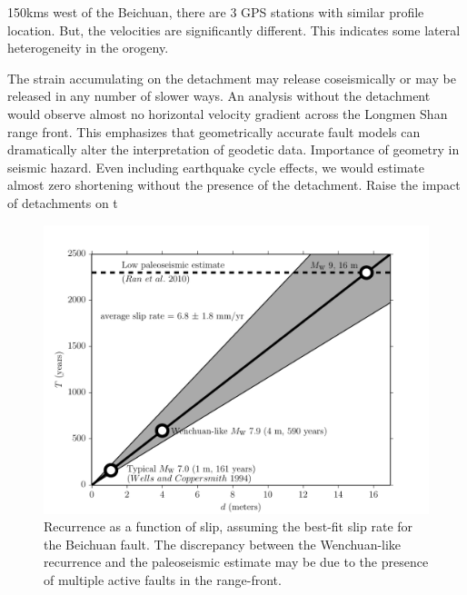 \documentclass[12pt]{article}
\begin{document}
150kms west of the Beichuan, there are 3 GPS stations with similar profile location. But, the velocities are significantly different. This indicates some lateral heterogeneity in the orogeny.

The strain accumulating on the detachment may release coseismically or may be released in any number of slower ways. 
An analysis without the detachment would observe almost no horizontal velocity gradient across the Longmen Shan range front. This emphasizes that geometrically accurate fault models can dramatically alter the interpretation of geodetic data. 
Importance of geometry in seismic hazard. Even including earthquake cycle effects, we would estimate almost zero shortening without the presence of the detachment. Raise the impact of detachments on t

\begin{figure}[h!]
    \centering
    \includegraphics{figs/hazard_all_details.pdf}
    \caption{Recurrence as a function of slip, assuming the best-fit slip rate for the Beichuan fault. The discrepancy between the Wenchuan-like recurrence and the paleoseismic estimate may be due to the presence of multiple active faults in the range-front.}
    \label{fig:hazard}
\end{figure}
\end{document}
